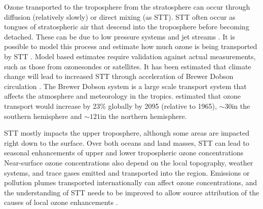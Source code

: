     
    Ozone transported to the troposphere from the stratosphere can occur through diffusion (relatively slowly) or direct mixing (as STT).
    STT often occur as tongues of stratospheric air that descend into the troposphere before becoming detached.
    These can be due to low pressure systems and jet streams \parencite{Sprenger2003}.
    It is possible to model this process and estimate how much ozone is being transported by STT \parencite[e.g.][]{Young2013,Ojha2016}.
    Model based estimates require validation against actual measurements, such as those from ozonesondes or satellites.
    It has been estimated that climate change will lead to increased STT through acceleration of Brewer Dobson circulation \parencite{Hegglin2009}.
    The Brewer Dobson system is a large scale transport system that affects the atmosphere and meteorology in the tropics.
    \textcite{Hegglin2009} estimated that ozone transport would increase by 23\% globally by 2095 (relative to 1965), $\sim 30$\tgpyr in the southern hemisphere and $\sim 121$\tgpyr in the northern hemisphere.
    
    STT mostly impacts the upper troposphere, although some areas are impacted right down to the surface.
    Over both oceans and land masses, STT can lead to seasonal enhancements of upper and lower tropospheric ozone concentrations \parencite{Lin2015,Liu2017,Kuang2017}
    Near-surface ozone concentrations also depend on the local topography, weather systems, and trace gases emitted and transported into the region.
    Emissions or pollution plumes transported internationally can affect ozone concentrations, and the understanding of STT needs to be improved to allow source attribution of the causes of local ozone enhancements \parencite{Lin2015}.
    
